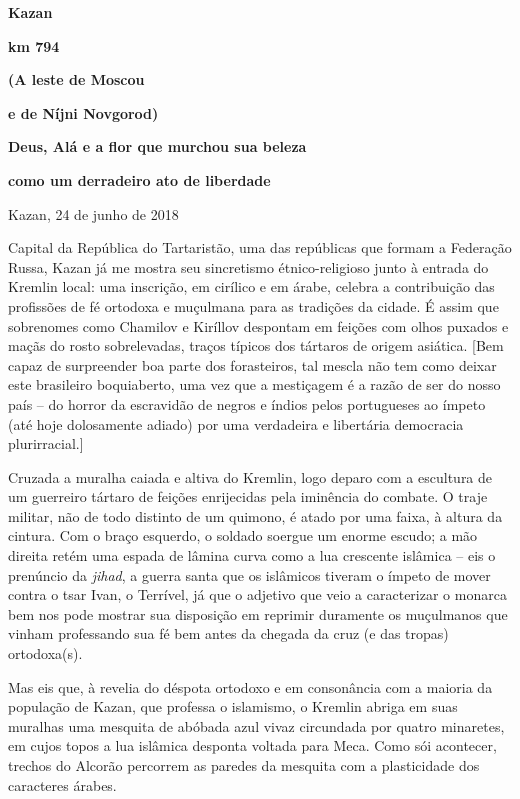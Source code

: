 \textbf{Kazan}

\textbf{km 794}

\textbf{(A leste de Moscou }

\textbf{e de Níjni Novgorod)}

\textbf{Deus, Alá e a flor que murchou sua beleza }

\textbf{como um derradeiro ato de liberdade}

Kazan, 24 de junho de 2018

Capital da República do Tartaristão, uma das repúblicas que formam a
Federação Russa, Kazan já me mostra seu sincretismo étnico-religioso
junto à entrada do Kremlin local: uma inscrição, em cirílico e em árabe,
celebra a contribuição das profissões de fé ortodoxa e muçulmana para as
tradições da cidade. É assim que sobrenomes como Chamilov e Kiríllov
despontam em feições com olhos puxados e maçãs do rosto sobrelevadas,
traços típicos dos tártaros de origem asiática. {[}Bem capaz de
surpreender boa parte dos forasteiros, tal mescla não tem como deixar
este brasileiro boquiaberto, uma vez que a mestiçagem é a razão de ser
do nosso país -- do horror da escravidão de negros e índios pelos
portugueses ao ímpeto (até hoje dolosamente adiado) por uma verdadeira e
libertária democracia plurirracial.{]}

Cruzada a muralha caiada e altiva do Kremlin, logo deparo com a
escultura de um guerreiro tártaro de feições enrijecidas pela iminência
do combate. O traje militar, não de todo distinto de um quimono, é atado
por uma faixa, à altura da cintura. Com o braço esquerdo, o soldado
soergue um enorme escudo; a mão direita retém uma espada de lâmina curva
como a lua crescente islâmica -- eis o prenúncio da \emph{jihad}, a
guerra santa que os islâmicos tiveram o ímpeto de mover contra o tsar
Ivan, o Terrível, já que o adjetivo que veio a caracterizar o monarca
bem nos pode mostrar sua disposição em reprimir duramente os muçulmanos
que vinham professando sua fé bem antes da chegada da cruz (e das
tropas) ortodoxa(s).

Mas eis que, à revelia do déspota ortodoxo e em consonância com a
maioria da população de Kazan, que professa o islamismo, o Kremlin
abriga em suas muralhas uma mesquita de abóbada azul vivaz circundada
por quatro minaretes, em cujos topos a lua islâmica desponta voltada
para Meca. Como sói acontecer, trechos do Alcorão percorrem as paredes
da mesquita com a plasticidade dos caracteres árabes.

